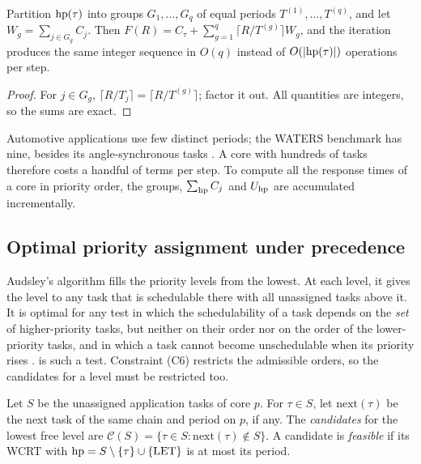 \begin{lemma}
\label{lem:group}
Partition $\mathrm{hp}(\tau)$ into groups $G_1,\dots,G_q$ of equal periods
$T^{(1)},\dots,T^{(q)}$, and let $W_g=\sum_{j\in G_g}C_j$. Then $F(R)=
C_\tau+\sum_{g=1}^{q}\lceil R/T^{(g)}\rceil W_g$, and the iteration produces
the same integer sequence in $O(q)$ instead of $O(|\mathrm{hp}(\tau)|)$
operations per step.
\end{lemma}
\begin{proof}
For $j\in G_g$, $\lceil R/T_j\rceil=\lceil R/T^{(g)}\rceil$; factor it out.
All quantities are integers, so the sums are exact.
\end{proof}
Automotive applications use few distinct periods; the WATERS benchmark has
nine, besides its angle-synchronous tasks \cite{kramer2015waters}. A core with hundreds of tasks therefore costs
a handful of terms per step. To compute all the response times of a core
in priority order, the groups, $\sum_{\mathrm{hp}}C_j$ and $U_{\mathrm{hp}}$ are
accumulated incrementally.

\subsection{Optimal priority assignment under precedence}
\label{sec:audsley}

Audsley's algorithm \cite{audsley2001priority} fills the priority levels
from the lowest. At each level, it gives the level to any task that is
schedulable there with all unassigned tasks above it. It is optimal for
any test in which the schedulability of a task depends on the \emph{set}
of higher-priority tasks, but neither on their order nor on the order of
the lower-priority tasks, and in which a task cannot become unschedulable
when its priority rises \cite{audsley2001priority}.  is such
a test. Constraint (C6) restricts the admissible orders, so the candidates
for a level must be restricted too.

\begin{definition}[Candidates]
Let $S$ be the unassigned application tasks of core $p$. For $\tau\in S$,
let $\mathrm{next}(\tau)$ be the next task of the same chain and period on
$p$, if any. The \emph{candidates} for the lowest free level are
$\mathcal{C}(S)=\{\tau\in S:\mathrm{next}(\tau)\notin S\}$. A candidate is
\emph{feasible} if its WCRT with $\mathrm{hp}=S\setminus\{\tau\}\cup\{\mathrm{LET}\}$ is at
most its period.
\end{definition}


